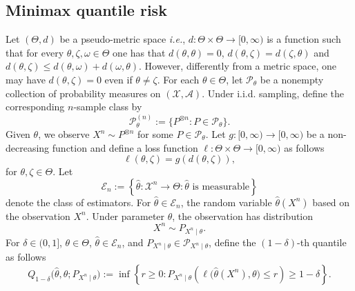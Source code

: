\documentclass[11pt]{article}
\theoremstyle{definition}
\theoremstyle{remark}
\newcommand{\1}{\boldsymbol{1}}
\begin{document}
\subsection{Minimax quantile risk}
Let $(\Theta, d)$ be a pseudo-metric space \textit{i.e.}, $d:\Theta \times \Theta \to [0,\infty) $ is a function such that for every $\theta,\zeta,\omega \in \Theta$ one has that $d(\theta,\theta)=0$, $d(\theta,\zeta)=d(\zeta,\theta)$ and $d(\theta,\zeta)\leq d(\theta,\omega)+d(\omega,\theta)$. However, differently from a metric space, one may have $d(\theta,\zeta)=0$ even if $\theta\neq \zeta$. For each \(\theta\in\Theta\), let \(\mathscr P_\theta\) be a nonempty collection of probability measures on \((\mathcal X,\mathcal A)\). Under i.i.d. sampling, define the corresponding \(n\)-sample class by
\[
\mathscr P_\theta^{(n)}
:=
\{P^{\otimes n}:P\in\mathscr P_\theta\}.
\]
Given \(\theta\), we observe \(X^n\sim P^{\otimes n}\) for some \(P\in\mathscr P_\theta\).
Let $g:[0,\infty) \to [0,\infty)$ be a non-decreasing function and define a loss function $\ell:\Theta \times\Theta \to [0,\infty)$ as follows
$$ \ell(\theta,\zeta)= g(d(\theta,\zeta)),$$
for $\theta,\zeta \in \Theta$.
Let
\[
\mathcal E_n
:=
\left\{
\widehat\theta:\mathcal X^n\to\Theta:
\widehat\theta\text{ is measurable}
\right\}
\]
denote the class of estimators. For \(\widehat\theta\in\mathcal E_n\), the random variable \(\widehat\theta(X^n)\) based on the observation \(X^n\). Under parameter \(\theta\), the observation has distribution\[X^n\sim P_{X^n\mid\theta}.\]
For \(\delta\in(0,1]\), \(\theta\in\Theta\), \(\widehat\theta\in\mathcal E_n\), and \(P_{X^n\mid\theta}\in\mathscr P_{X^n\mid\theta}\), define the $(1-\delta)$-th quantile as follows
\[
Q_{1-\delta}
\bigl(\widehat\theta,\theta;P_{X^n\mid\theta}\bigr)
:=
\inf\left\{
r\ge0:
P_{X^n\mid\theta}
\left(
\ell\bigl(\widehat\theta(X^n),\theta\bigr)\le r
\right)
\ge1-\delta
\right\}.
\]
\end{document}
